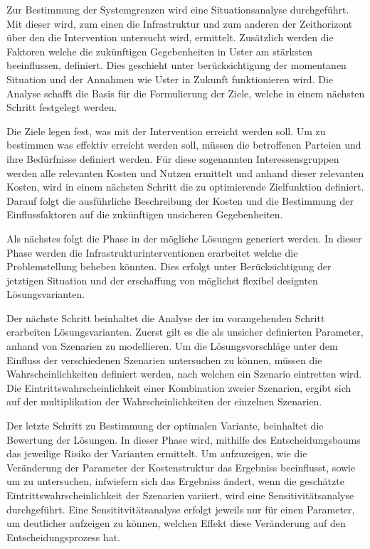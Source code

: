 \begin{IMleftrightskip}
Zur Bestimmung der Systemgrenzen wird eine Situationsanalyse durchgeführt. Mit dieser wird, zum einen die Infrastruktur und zum anderen der Zeithorizont über den die Intervention untersucht wird, ermittelt. Zusätzlich werden die Faktoren welche die zukünftigen Gegebenheiten in Uster am stärksten beeinflussen, definiert. Dies geschieht unter berücksichtigung der momentanen Situation und der Annahmen wie Uster in Zukunft funktionieren wird. Die Analyse schafft die Basis für die Formulierung der Ziele, welche in einem nächsten Schritt festgelegt werden.

Die Ziele legen fest, was mit der Intervention erreicht werden soll. Um zu bestimmen was effektiv erreicht werden soll, müssen die betroffenen Parteien und ihre Bedürfnisse definiert werden. Für diese sogenannten Interessensgruppen werden alle relevanten Kosten und Nutzen ermittelt und anhand dieser relevanten Kosten, wird in einem nächsten Schritt die zu optimierende Zielfunktion definiert.
Darauf folgt die ausführliche Beschreibung der Kosten und die Bestimmung der Einflussfaktoren auf die zukünftigen unsicheren Gegebenheiten. 

Als nächstes folgt die Phase in der mögliche Lösungen generiert werden. In dieser Phase werden die Infrastrukturinterventionen erarbeitet welche die Problemstellung beheben könnten. Dies erfolgt unter Berücksichtigung der jetztigen Situation und der erschaffung von möglichst flexibel designten Lösungsvarianten.

Der nächste Schritt beinhaltet die Analyse der im vorangehenden Schritt erarbeiten Lösungsvarianten. Zuerst gilt es die als unsicher definierten Parameter, anhand von Szenarien zu modellieren. Um die Lösungsvorschläge unter dem Einfluss der verschiedenen Szenarien untersuchen zu können, müssen die Wahrscheinlichkeiten definiert werden, nach welchen ein Szenario eintretten wird. Die Eintrittswahrscheinlichkeit einer Kombination zweier Szenarien, ergibt sich auf der multiplikation der Wahrscheinlichkeiten der einzelnen Szenarien.

Der letzte Schritt zu Bestimmung der optimalen Variante, beinhaltet die Bewertung der Lösungen. In dieser Phase wird, mithilfe des Entscheidungsbaums das jeweilige Risiko der Varianten ermittelt. Um aufzuzeigen, wie die Veränderung der Parameter der Kostenstruktur das Ergebniss beeinflusst, sowie um zu untersuchen, infwiefern sich das Ergebniss ändert, wenn die geschätzte Eintrittswahrscheinlichkeit der Szenarien variiert, wird eine Sensitivitätsanalyse durchgeführt. Eine Sensititvitätsanalyse erfolgt jeweils nur für einen Parameter, um deutlicher aufzeigen zu können, welchen Effekt diese Veränderung auf den Entscheidungsprozess hat. 
\end{IMleftrightskip}

